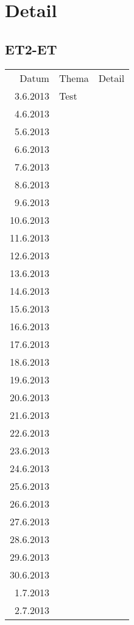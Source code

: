
\section{Detail}

\subsection{ET2-ET}
\begin{tabular}{r l p{}}
\rowcolor{lgray} Datum     & Thema         & Detail \\
\rowcolor{white}  3.6.2013 & Test          &  \\
\rowcolor{lgray}  4.6.2013 &               &  \\
\rowcolor{white}  5.6.2013 &               &  \\
\rowcolor{lgray}  6.6.2013 &               &  \\
\rowcolor{white}  7.6.2013 &               &  \\
\rowcolor{lgray}  8.6.2013 &               &  \\
\rowcolor{white}  9.6.2013 &               &  \\
\rowcolor{lgray} 10.6.2013 &               &  \\
\rowcolor{white} 11.6.2013 &               &  \\
\rowcolor{lgray} 12.6.2013 &               &  \\
\rowcolor{white} 13.6.2013 &               &  \\
\rowcolor{lgray} 14.6.2013 &               &  \\
\rowcolor{white} 15.6.2013 &               &  \\
\rowcolor{lgray} 16.6.2013 &               &  \\
\rowcolor{white} 17.6.2013 &               &  \\
\rowcolor{lgray} 18.6.2013 &               &  \\
\rowcolor{white} 19.6.2013 &               &  \\
\rowcolor{lgray} 20.6.2013 &               &  \\
\rowcolor{white} 21.6.2013 &               &  \\
\rowcolor{lgray} 22.6.2013 &               &  \\
\rowcolor{white} 23.6.2013 &               &  \\
\rowcolor{lgray} 24.6.2013 &               &  \\
\rowcolor{white} 25.6.2013 &               &  \\
\rowcolor{lgray} 26.6.2013 &               &  \\
\rowcolor{white} 27.6.2013 &               &  \\
\rowcolor{lgray} 28.6.2013 &               &  \\
\rowcolor{white} 29.6.2013 &               &  \\
\rowcolor{lgray} 30.6.2013 &               &  \\
\rowcolor{white}  1.7.2013 &               &  \\
\rowcolor{lgray}  2.7.2013 &               &  \\
\end{tabular}

